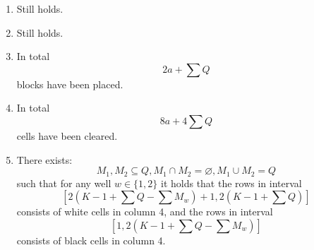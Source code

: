 \begin{enumerate}
\item Still holds.
\item Still holds.
\item In total
\begin{equation*}
    2a + \sum Q
\end{equation*}
blocks have been placed.

\item In total
\begin{equation*}
    8a + 4 \sum Q
\end{equation*}
cells have been cleared.

\item There exists:
\begin{equation*}
    M_1, M_2 \subseteq Q, M_1 \cap M_2 = \varnothing, M_1 \cup M_2 = Q
\end{equation*}
such that for any well $w \in \{1,2\}$ it holds that the rows in interval
\begin{equation*}
        \left[ 2 \left( K-1 + \sum Q - \sum M_w \right) +1, 2 \left( K-1 + \sum Q \right) \right]
    \end{equation*}
consists of white cells in column 4, and the rows in interval
    \begin{equation*}
        \left[ 1, 2 \left( K-1 + \sum Q - \sum M_w \right) \right]
    \end{equation*}
consists of black cells in column 4.
\end{enumerate}
